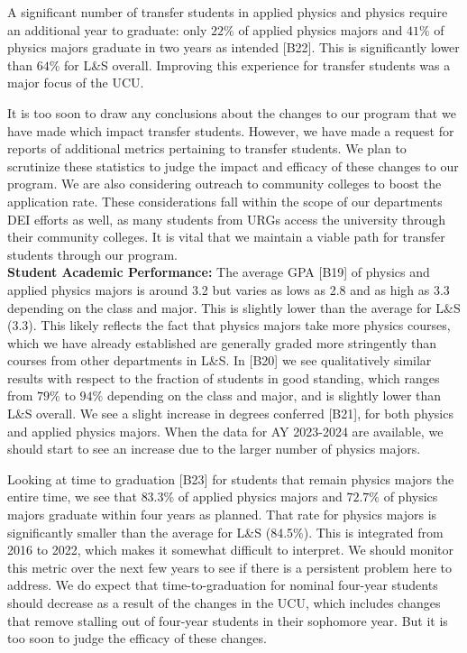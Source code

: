 \documentclass[12pt]{article}
\begin{document}
A significant number of transfer students in applied physics and
physics require an additional year to graduate: only $22\%$ of applied
physics majors and $41\%$ of physics majors graduate in two years as
intended [B22].  This is significantly lower than $64\%$ for L\&S
overall.  Improving this experience for transfer students was a major
focus of the UCU.

It is too soon to draw any conclusions about the changes to our
program that we have made which impact transfer students.  However, we
have made a request for reports of additional metrics pertaining to
transfer students.  We plan to scrutinize these statistics to judge
the impact and efficacy of these changes to our program.  We are also
considering outreach to community colleges to boost the application
rate.  These considerations fall within the scope of our departments
DEI efforts as well, as many students from URGs access the university
through their community colleges.  It is vital that we maintain a
viable path for transfer students through our program.\\[3pt]

\noindent
{\bf Student Academic Performance:} The average GPA [B19] of physics
and applied physics majors is around 3.2 but varies as lows as 2.8 and
as high as 3.3 depending on the class and major.  This is slightly
lower than the average for L\&S (3.3).  This likely reflects the fact
that physics majors take more physics courses, which we have already
established are generally graded more stringently than courses from
other departments in L\&S.  In [B20] we see qualitatively similar
results with respect to the fraction of students in good standing,
which ranges from $79\%$ to $94\%$ depending on the class and major,
and is slightly lower than L\&S overall.  We see a slight increase in
degrees conferred [B21], for both physics and applied physics majors.
When the data for AY 2023-2024 are available, we should start to see
an increase due to the larger number of physics majors.

Looking at time to graduation [B23] for students that remain physics
majors the entire time, we see that $83.3\%$ of applied physics majors
and $72.7\%$ of physics majors graduate within four years as planned.
That rate for physics majors is significantly smaller than the average
for L\&S (84.5\%).  This is integrated from 2016 to 2022, which makes
it somewhat difficult to interpret.  We should monitor this metric
over the next few years to see if there is a persistent problem here
to address.  We do expect that time-to-graduation for nominal
four-year students should decrease as a result of the changes in the
UCU, which includes changes that remove stalling out of four-year
students in their sophomore year.  But it is too soon to judge the
efficacy of these changes.\\[3pt]
\end{document}
